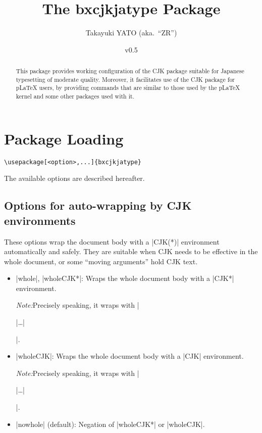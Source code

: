 \documentclass[a4paper]{article}
\newcommand{\PkgVersion}{0.5}
\newcommand{\PkgDate}{2023/07/23}
\newcommand{\Pkg}[1]{\textsf{#1}}
\newcommand{\Note}{\par\noindent \emph{Note:}\quad}
\newcommand{\Means}{:\hspace{1em plus 1em}}
\newcommand{\wbr}{\linebreak[0]}
\providecommand{\pLaTeX}{p\LaTeX}
\begin{document}
\title{The \Pkg{bxcjkjatype} Package}
\author{Takayuki YATO (aka.~``ZR'')}
\date{v\PkgVersion\quad[\PkgDate]}
\maketitle

\begin{abstract}
This package provides working configuration of the \Pkg{CJK} package
suitable for Japanese typesetting of moderate quality.
Moreover, it facilitates use of the \Pkg{CJK} package for {\pLaTeX}
users, by providing commands that are similar to those used by the
{\pLaTeX} kernel and some other packages used with it.
\end{abstract}

\tableofcontents

\section{Package Loading}
\label{sec:loading}

\begin{verbatim}
\usepackage[<option>,...]{bxcjkjatype}
\end{verbatim}

The available options are described hereafter.

\subsection{Options for auto-wrapping by CJK environments}

These options wrap the document body with a |CJK(*)|
environment automatically and safely.
They are suitable
when CJK needs to be effective in the whole document,
or some ``moving arguments'' hold CJK text.

\begin{itemize}
\item |whole|, |wholeCJK*|\Means
  Wraps the whole document body with a |CJK*| environment.
  \Note Precisely speaking,
  it wraps with |\begin{uCJK*}|\ldots\wbr|\end{uCJK*}|.
\item |wholeCJK|\Means
  Wraps the whole document body with a |CJK| environment.
  \Note Precisely speaking,
  it wraps with |\begin{uCJK}|\ldots\wbr|\end{uCJK}|.
\item |nowhole| (default)\Means
  Negation of |wholeCJK*| or |wholeCJK|.
\end{itemize}
\end{document}
